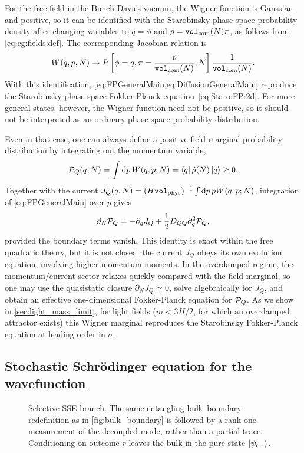 \documentclass{article}
\newcommand{\VF}{\mathtt{vol}_{\rm com}}
\newcommand{\Vphys}{\mathtt{vol}_{\rm phys}}
\numberwithin{equation}{section}
\begin{document}
	For the free field in the Bunch-Davies vacuum, the Wigner function is Gaussian and positive, so it can be identified with the Starobinsky phase-space probability density after changing variables to \(q=\phi\) and \(p=\VF(N)\pi\), as follows from \cref{eq:cg:fields:def}. The corresponding Jacobian relation is
	\begin{equation}
	W(q,p,N)\to P\left[\phi=q,\pi=\frac{p}{\VF(N)},N\right]\frac{1}{\VF(N)} .
	\end{equation}
	With this identification, \cref{eq:FPGeneralMain,eq:DiffusionGeneralMain} reproduce the Starobinsky phase-space Fokker-Planck equation~\eqref{eq:Staro:FP:2d}. For more general states, however, the Wigner function need not be positive, so it should not be interpreted as an ordinary phase-space probability distribution.

	Even in that case, one can always define a positive field marginal probability distribution by integrating out the momentum variable,
	\begin{equation}
		{\cal P}_Q(q,N)=\int \dd p\,W(q,p;N)=\bra{q}\hat\rho(N)\ket{q}\geq0 .
	\end{equation}
	Together with the current \(J_Q(q,N)=(H\Vphys)^{-1}\int \dd p\,pW(q,p;N)\), integration of \cref{eq:FPGeneralMain} over \(p\) gives
	\begin{equation}
		\partial_N{\cal P}_Q=-\partial_qJ_Q+\frac12D_{QQ}\partial_q^2{\cal P}_Q ,
	\end{equation}
    provided the boundary terms vanish. This identity is exact within the free quadratic theory, but it is not closed: the current \(J_Q\) obeys its own evolution equation, involving higher momentum moments. In the overdamped regime, the momentum/current sector relaxes quickly compared with the field marginal, so one may use the quasistatic closure \(\partial_N J_Q\simeq0\), solve algebraically for \(J_Q\), and obtain an effective one-dimensional Fokker-Planck equation for \({\cal P}_Q\). As we show in \cref{sec:light_mass_limit}, for light fields ($m<3H/2$, for which an overdamped attractor exists) this Wigner marginal reproduces the Starobinsky Fokker-Planck equation at leading order in $\sigma$.

	\subsection{Stochastic Schr\"odinger equation for the wavefunction}
    \label{sec:SSE}

    	\begin{figure}[ht]
		\centering
		
		\caption{\small Selective SSE branch. The same entangling bulk--boundary redefinition as in \cref{fig:bulk_boundary} is followed by a rank-one measurement of the decoupled mode, rather than a partial trace. Conditioning on outcome \(r\) leaves the bulk in the pure state \(\ket{\psi_{c,r}}\).}
		\label{fig:PureStatePOVM}
	\end{figure}
\end{document}
